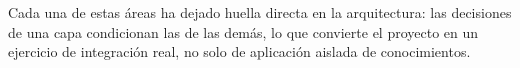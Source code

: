 Cada una de estas áreas ha dejado huella directa en la arquitectura:
las decisiones de una capa condicionan las de las demás, lo que convierte
el proyecto en un ejercicio de integración real, no solo de aplicación
aislada de conocimientos.


